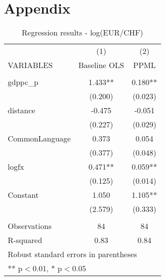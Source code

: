 \section{Appendix}
\label{alt}

\begin{table}[htbp]
  \centering
  \caption{Regression results - log(EUR/CHF)}
    \begin{tabular}{lrr}
    \toprule
      & \multicolumn{1}{c}{(1)} & \multicolumn{1}{c}{(2)} \\
    VARIABLES & \multicolumn{1}{c}{Baseline OLS} & \multicolumn{1}{c}{PPML} \\
    \midrule
			& \multicolumn{1}{c}{} & \multicolumn{1}{c}{} \\
    gdppc\_p & \multicolumn{1}{c}{1.433**} & \multicolumn{1}{c}{0.180**} \\
      & \multicolumn{1}{c}{(0.200)} & \multicolumn{1}{c}{(0.023)} \\
    distance & \multicolumn{1}{c}{-0.475} & \multicolumn{1}{c}{-0.051} \\
      & \multicolumn{1}{c}{(0.227)} & \multicolumn{1}{c}{(0.029)} \\
    CommonLanguage & \multicolumn{1}{c}{0.373} & \multicolumn{1}{c}{0.054} \\
      & \multicolumn{1}{c}{(0.377)} & \multicolumn{1}{c}{(0.048)} \\
    logfx & \multicolumn{1}{c}{0.471**} & \multicolumn{1}{c}{0.059**} \\
      & \multicolumn{1}{c}{(0.125)} & \multicolumn{1}{c}{(0.014)} \\
    Constant & \multicolumn{1}{c}{1.050} & \multicolumn{1}{c}{1.105**} \\
      & \multicolumn{1}{c}{(2.579)} & \multicolumn{1}{c}{(0.333)} \\
      & \multicolumn{1}{c}{} & \multicolumn{1}{c}{} \\
    Observations & \multicolumn{1}{c}{84} & \multicolumn{1}{c}{84} \\
    R-squared & \multicolumn{1}{c}{0.83} & \multicolumn{1}{c}{0.84} \\
		\bottomrule
		\multicolumn{3}{l}{\begin{minipage}[t]{0.5\columnwidth}Robust standard errors in parentheses\end{minipage}}\\
		\multicolumn{3}{l}{\begin{minipage}[t]{0.5\columnwidth}** p$<$0.01, * p$<$0.05\end{minipage}}\\
    \end{tabular}%
  \label{r:lnfx}%
\end{table}%